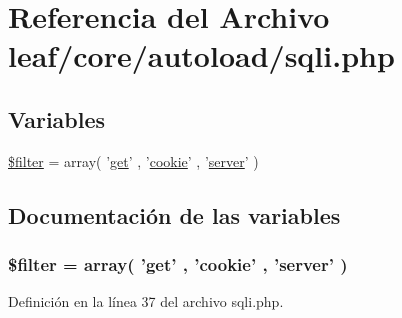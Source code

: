 \hypertarget{sqli_8php}{\section{Referencia del Archivo leaf/core/autoload/sqli.php}
\label{sqli_8php}
}
\subsection*{Variables}
\begin{DoxyCompactItemize}
\item 
\hyperlink{sqli_8php_aac53bdb48bdd96ff9c20e2a86f48ce5f}{\$filter} = array( '\hyperlink{classget}{get}' , '\hyperlink{classcookie}{cookie}' , '\hyperlink{classserver}{server}' )
\end{DoxyCompactItemize}


\subsection{Documentación de las variables}
\hypertarget{sqli_8php_aac53bdb48bdd96ff9c20e2a86f48ce5f}{
\subsubsection[{\$filter}]{\setlength{\rightskip}{0pt plus 5cm}\$filter = array( '{\bf get}' , '{\bf cookie}' , '{\bf server}' )}}\label{sqli_8php_aac53bdb48bdd96ff9c20e2a86f48ce5f}


Definición en la línea 37 del archivo sqli.\-php.

